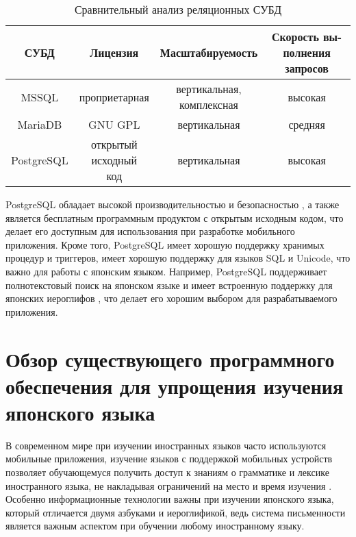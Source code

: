 \begin{table}[ht]
  \caption{Сравнительный анализ реляционных СУБД}
  \label{tab:rel-dbms}
  \begin{center}
    \begin{tabular}{|c|c|c|c|}
      \hline
      СУБД & Лицензия & Масштабируемость & \makecell{Скорость вы- \\ полнения запросов} \\
      \hline
      \hline
      MSSQL \cite{mssql} & проприетарная & \makecell{вертикальная, \\ комплексная} & высокая \\
      \hline
      MariaDB \cite{mariadb} & GNU GPL & вертикальная & средняя \\
      \hline
      PostgreSQL \cite{postgresql} & \makecell{открытый \\ исходный \\ код} & вертикальная & высокая  \\
      \hline
    \end{tabular}
  \end{center}
\end{table}

PostgreSQL обладает высокой производительностью и безопасностью \cite{relational-dbms},
а также является бесплатным программным продуктом с открытым
исходным кодом, что делает его доступным для использования при
разработке мобильного приложения. Кроме того, PostgreSQL имеет
хорошую поддержку хранимых процедур и триггеров, имеет хорошую
поддержку для языков SQL и Unicode, что важно для 
работы с японским языком. Например, PostgreSQL поддерживает 
полнотекстовый поиск на японском языке и имеет встроенную 
поддержку для японских иероглифов \cite{postgresql}, что делает его
хорошим выбором для разрабатываемого приложения.

\section{Обзор существующего программного обеспечения для упрощения изучения японского языка}

В современном мире при изучении иностранных языков часто используются
мобильные приложения, изучение языков с поддержкой мобильных устройств
позволяет обучающемуся получить доступ к знаниям о грамматике и
лексике иностранного языка, не накладывая ограничений на место
и время изучения \cite{mobapps-ll}. Особенно информационные технологии
важны при изучении японского языка, который отличается двумя
азбуками и иероглификой, ведь система письменности является важным
аспектом при обучении любому иностранному языку.

